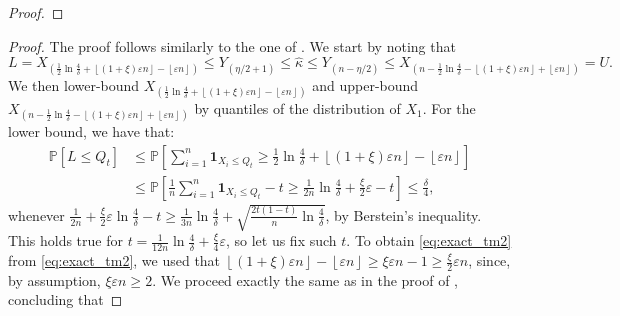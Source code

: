 \documentclass{article}
\theoremstyle{plain}
\newtheorem{proposition}[theorem]{Proposition}
\theoremstyle{definition}
\begin{document}
\begin{appendix}
\begin{proof}
\end{proof}


\begin{proof}
 The proof follows similarly to the one of . We start by noting that \[
   L=X_{(\frac{1}{2}\ln \frac{4}{\delta }+ \left\lfloor (1+\xi )\varepsilon n \right\rfloor - \left\lfloor \varepsilon n \right\rfloor)} \le Y_{(\eta  /2 +1)} \le \widehat{\kappa } \le Y_{(n - \eta /2)} \le X_{(n - \frac{1}{2}\ln \frac{4}{\delta } - \left\lfloor (1+\xi ) \varepsilon n \right\rfloor + \left\lfloor \varepsilon n \right\rfloor)}=U.  
 \] 
 We then lower-bound \( X_{(\frac{1}{2}\ln \frac{4}{\delta }+ \left\lfloor (1+\xi )\varepsilon n \right\rfloor - \left\lfloor \varepsilon n \right\rfloor)} \) and upper-bound \( X_{(n - \frac{1}{2}\ln \frac{4}{\delta } - \left\lfloor (1+\xi ) \varepsilon n \right\rfloor + \left\lfloor \varepsilon n \right\rfloor)} \) by quantiles of the distribution of \( X_1 \). For the lower bound, we have that:
 \begin{align}
   \mathbb{P}\left[L \le Q_t\right] &\le \mathbb{P}\left[\sum_{i=1}^n\mathbf{1}_{X_i \le Q_t} \ge \frac{1}{2}\ln \frac{4}{\delta }+ \left\lfloor (1+\xi ) \varepsilon n \right\rfloor - \left\lfloor \varepsilon n \right\rfloor\right] \label{eq:exact_tm1}\\
                                    & \le \mathbb{P}\left[\frac{1}{n} \sum_{i=1}^n \mathbf{1}_{X_i \le Q_t} - t \ge \frac{1}{2n} \ln \frac{4}{\delta } + \frac{\xi}{2} \varepsilon  - t\right] \le \frac{\delta}{4},\label{eq:exact_tm2} 
 \end{align} 
 whenever \( \frac{1}{2n} + \frac{\xi}{2}\varepsilon \ln \frac{4}{\delta } -t \ge \frac{1}{3n}\ln \frac{4}{\delta } + \sqrt{\frac{2t(1-t)}{n}\ln \frac{4}{\delta }}  \), by Berstein's inequality. This holds true for \( t =  \frac{1}{12n} \ln \frac{4}{\delta } + \frac{\xi}{4}\varepsilon   \), so let us fix such \( t \). To obtain \eqref{eq:exact_tm2} from \eqref{eq:exact_tm2}, we used that \( \left\lfloor (1+\xi ) \varepsilon n \right\rfloor - \left\lfloor \varepsilon n \right\rfloor \ge \xi \varepsilon n -1 \ge \frac{\xi}{2} \varepsilon n\), since, by assumption, \( \xi  \varepsilon n \ge 2\). We proceed exactly the same as in the proof of , concluding that 

\end{proof}
\end{appendix}
\end{document}
